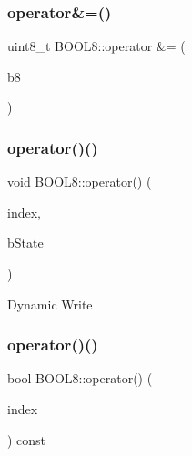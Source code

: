 \hypertarget{struct_b_o_o_l8_ae47dbba9a70f023230fdee19c62b2390}{}\label{struct_b_o_o_l8_ae47dbba9a70f023230fdee19c62b2390} 
\subsubsection{\texorpdfstring{operator\&=()}{operator\&=()}\hspace{0.1cm}{\footnotesize\ttfamily [2/2]}}
{\footnotesize\ttfamily uint8\+\_\+t B\+O\+O\+L8\+::operator \&= (\begin{DoxyParamCaption}\item[{const \hyperlink{struct_b_o_o_l8}{B\+O\+O\+L8}}]{b8 }\end{DoxyParamCaption})\hspace{0.3cm}{\ttfamily [inline]}}

\hypertarget{struct_b_o_o_l8_aaa6b5d11f940b5b3d7de7563e8195899}{}\label{struct_b_o_o_l8_aaa6b5d11f940b5b3d7de7563e8195899} 
\subsubsection{\texorpdfstring{operator()()}{operator()()}\hspace{0.1cm}{\footnotesize\ttfamily [1/2]}}
{\footnotesize\ttfamily void B\+O\+O\+L8\+::operator() (\begin{DoxyParamCaption}\item[{const uint8\+\_\+t}]{index,  }\item[{const bool}]{b\+State }\end{DoxyParamCaption})\hspace{0.3cm}{\ttfamily [inline]}}

Dynamic Write \hypertarget{struct_b_o_o_l8_a758aa26902738ace2ecbfea98a7c702a}{}\label{struct_b_o_o_l8_a758aa26902738ace2ecbfea98a7c702a} 
\subsubsection{\texorpdfstring{operator()()}{operator()()}\hspace{0.1cm}{\footnotesize\ttfamily [2/2]}}
{\footnotesize\ttfamily bool B\+O\+O\+L8\+::operator() (\begin{DoxyParamCaption}\item[{const uint8\+\_\+t}]{index }\end{DoxyParamCaption}) const\hspace{0.3cm}{\ttfamily [inline]}}

